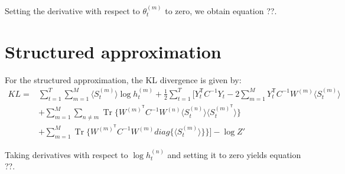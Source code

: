 \documentclass{article}
\DeclareMathOperator{\Tr}{Tr}
\begin{document}
Setting the derivative with respect to $\theta_t^{(m)}$ to zero, we obtain equation ??.

\section{Structured approximation}

For the structured approximation, the KL divergence is given by:
\begin{align*}
KL = &\sum_{t=1}^T \sum_{m=1}^M \langle S_t^{(m)} \rangle \log h_t^{(m)} + \frac{1}{2} \sum_{t=1}^T \Bigg[ Y_t^\mathsf{T} C^{-1} Y_t - 2 \sum_{m=1}^M Y_t^\mathsf{T} C^{-1} W^{(m)} \langle S_t^{(m)} \rangle \\
&+ \sum_{m=1}^M \sum_{n \ne m} \Tr\bigg\{ W^{(m)^\mathsf{T}} C^{-1} W^{(n)} \langle S_t^{(n)} \rangle \langle S_t^{(m)^\mathsf{T}} \rangle \bigg\} \\
&+ \sum_{m=1}^M \Tr\bigg\{ W^{(m)^\mathsf{T}} C^{-1} W^{(m)} diag\Big\{\langle S_t^{(m)} \rangle\Big\} \bigg\} \Bigg] - \log Z'
\end{align*}

Taking derivatives with respect to $\log h_t^{(n)}$ and setting it to zero yields equation ??.
\end{document}
